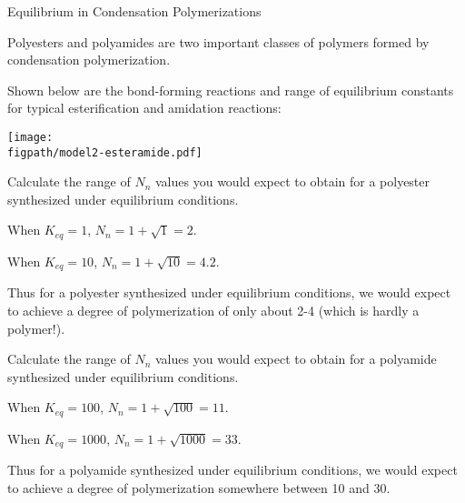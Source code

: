 \begin{activity}{Equilibrium in Condensation Polymerizations}
\begin{ctqs}
\end{ctqs}
	
\begin{model}
\label{\labelbase:mdl:K}

Polyesters and polyamides are two important classes of polymers formed by condensation polymerization.

Shown below are the bond-forming reactions and range of equilibrium constants for typical esterification and amidation reactions:
	
		\vspace{0.1in}
		\centerline{\texttt{[image: \\figpath/model2-esteramide.pdf]}}

\end{model}

\begin{ctqs}
		\question Calculate the range of $N_n$ values you would expect to obtain for a polyester synthesized under equilibrium conditions.
		
			\begin{solution}[1.5in]
			
				When $K_{eq}=1$, $N_n = 1+ \sqrt{1} = 2$.
			
				When $K_{eq}=10$, $N_n = 1+ \sqrt{10} = 4.2$.
				
				Thus for a polyester synthesized under equilibrium conditions, we would expect to achieve a degree of polymerization of only about 2-4 (which is hardly a polymer!).			
			
			\end{solution}
		
		\question Calculate the range of $N_n$ values you would expect to obtain for a polyamide synthesized under equilibrium conditions.
		
			\begin{solution}[1.5in]
			
				When $K_{eq}=100$, $N_n = 1+ \sqrt{100} = 11$.
			
				When $K_{eq}=1000$, $N_n = 1+ \sqrt{1000} = 33$.
				
				Thus for a polyamide synthesized under equilibrium conditions, we would expect to achieve a degree of polymerization somewhere between 10 and 30.
			\end{solution}
		
\end{ctqs}

\begin{infobox}


\end{infobox}
\end{activity}
